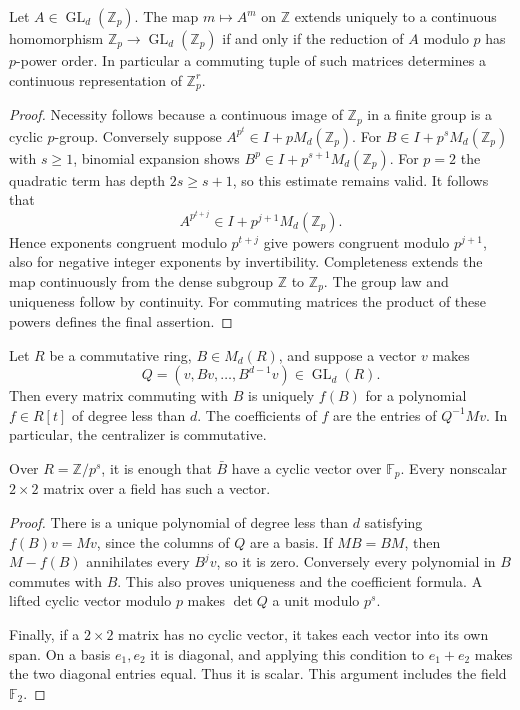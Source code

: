 \begin{lemma}\label{lem:procyclic-powers}
Let $A\in\operatorname{GL}_d(\mathbb Z_p)$. The map $m\mapsto A^m$ on $\mathbb Z$ extends uniquely to a continuous homomorphism $\mathbb Z_p\to\operatorname{GL}_d(\mathbb Z_p)$ if and only if the reduction of $A$ modulo $p$ has $p$-power order. In particular a commuting tuple of such matrices determines a continuous representation of $\mathbb Z_p^r$.
\end{lemma}
\begin{proof}
Necessity follows because a continuous image of $\mathbb Z_p$ in a finite group is a cyclic $p$-group. Conversely suppose $A^{p^t}\in I+pM_d(\mathbb Z_p)$. For $B\in I+p^sM_d(\mathbb Z_p)$ with $s\geq1$, binomial expansion shows $B^p\in I+p^{s+1}M_d(\mathbb Z_p)$. For $p=2$ the quadratic term has depth $2s\geq s+1$, so this estimate remains valid. It follows that
\[
 A^{p^{t+j}}\in I+p^{j+1}M_d(\mathbb Z_p).
\]
Hence exponents congruent modulo $p^{t+j}$ give powers congruent modulo $p^{j+1}$, also for negative integer exponents by invertibility. Completeness extends the map continuously from the dense subgroup $\mathbb Z$ to $\mathbb Z_p$. The group law and uniqueness follow by continuity. For commuting matrices the product of these powers defines the final assertion.
\end{proof}

\begin{lemma}\label{lem:cyclic-centralizer}
Let $R$ be a commutative ring, $B\in M_d(R)$, and suppose a vector $v$ makes
\[
 Q=(v,Bv,\ldots,B^{d-1}v)\in\operatorname{GL}_d(R).
\]
Then every matrix commuting with $B$ is uniquely $f(B)$ for a polynomial $f\in R[t]$ of degree less than $d$. The coefficients of $f$ are the entries of $Q^{-1}Mv$. In particular, the centralizer is commutative.

Over $R=\mathbb Z/p^s$, it is enough that $\bar B$ have a cyclic vector over $\mathbb F_p$. Every nonscalar $2\times2$ matrix over a field has such a vector.
\end{lemma}
\begin{proof}
There is a unique polynomial of degree less than $d$ satisfying $f(B)v=Mv$, since the columns of $Q$ are a basis. If $MB=BM$, then $M-f(B)$ annihilates every $B^jv$, so it is zero. Conversely every polynomial in $B$ commutes with $B$. This also proves uniqueness and the coefficient formula. A lifted cyclic vector modulo $p$ makes $\det Q$ a unit modulo $p^s$.

Finally, if a $2\times2$ matrix has no cyclic vector, it takes each vector into its own span. On a basis $e_1,e_2$ it is diagonal, and applying this condition to $e_1+e_2$ makes the two diagonal entries equal. Thus it is scalar. This argument includes the field $\mathbb F_2$.
\end{proof}

